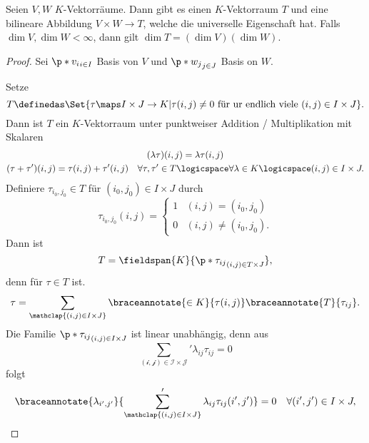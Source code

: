 \begin{satz}
  Seien \( V,W \) \( K \)-Vektorräume. Dann gibt es einen \( K \)-Vektorraum \( T \) und eine bilineare Abbildung \( V\times W\to T \), welche die universelle Eigenschaft \tensorproperty hat. Falls \( \dim{V}, \dim{W}<\infty \), dann gilt \( \dim{T}=(\dim{V})(\dim{W}) \).
\end{satz}
\begin{proof}
  Sei \( \p*{v_i}_{i\in I} \) Basis von \( V \) und \( \p*{w_j}_{j\in J} \) Basis on \( W \).

  Setze
  \begin{equation*}
    T\definedas \Set{\tau\maps I\times J\to K|\tau(i,j)\neq 0 \text{ für ur endlich viele }(i,j)\in I\times J}.
  \end{equation*}
  Dann ist \( T \) ein \( K \)-Vektorraum unter punktweiser Addition / Multiplikation mit Skalaren
  \begin{gather*}
    (\lambda \tau)(i,j)=\lambda \tau(i,j)\\
    (\tau+\tau')(i,j)=\tau(i,j)+\tau'(i,j)\quad \forall \tau,\tau'\in T\logicspace \forall \lambda\in K\logicspace (i,j)\in I\times J.
  \end{gather*}
  Definiere \( \tau_{i_0,j_0}\in T \) für \( (i_0,j_0)\in I\times J \) durch
  \begin{equation*}
    \tau_{i_0,j_0}(i,j)=\begin{cases}
      1&(i,j)=(i_0,j_0)\\
      0&(i,j)\neq (i_0,j_0).
    \end{cases}
  \end{equation*}
  Dann ist
  \begin{equation*}
    T=\fieldspan{K}{\p*{\tau_{ij}}_{(i,j)\in T\times J}},
  \end{equation*}
  denn für \( \tau\in T \) ist.
  \begin{equation*}
    \tau=\sum_{\mathclap{(i,j)\in I\times J}}\braceannotate{\in K}{\tau(i,j)}\braceannotate{T}{\tau_{ij}}.
  \end{equation*}
  Die Familie \( \p*{\tau_{ij}}_{(i,j)\in I\times J} \) ist linear unabhängig, denn aus
  \begin{equation*}
    \sum_{\mathcal{(i,j)\in I\times J}}'\lambda_{ij}\tau_{ij}=0
  \end{equation*}
  folgt
  \begin{equation*}
    \braceannotate{\lambda_{i',j'}}{\sum_{\mathclap{(i,j)\in I\times J}}'\lambda_{ij}\tau_{ij}(i',j')}=0\quad \forall (i',j')\in I\times J,
  \end{equation*}

\end{proof}
